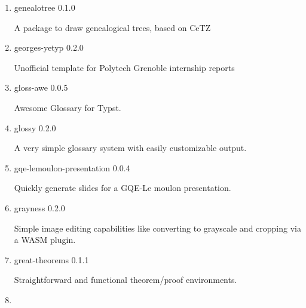 \begin{enumerate}

  { g-exam } { 0.4.1 }

  Create exams with student information, grade chart, score control,
  questions, and sub-questions.
\item
  \href{/universe/package/genealotree/}{}

  { genealotree } { 0.1.0 }

  A package to draw genealogical trees, based on CeTZ
\item
  \href{/universe/package/georges-yetyp/}{}


  { georges-yetyp } { 0.2.0 }

  Unofficial template for Polytech Grenoble internship reports
\item
  \href{/universe/package/gloss-awe/}{}

  { gloss-awe } { 0.0.5 }

  Awesome Glossary for Typst.
\item
  \href{/universe/package/glossy/}{}

  { glossy } { 0.2.0 }

  A very simple glossary system with easily customizable output.
\item
  \href{/universe/package/gqe-lemoulon-presentation/}{}


  { gqe-lemoulon-presentation } { 0.0.4 }

  Quickly generate slides for a GQE-Le moulon presentation.
\item
  \href{/universe/package/grayness/}{}

  { grayness } { 0.2.0 }

  Simple image editing capabilities like converting to grayscale and
  cropping via a WASM plugin.
\item
  \href{/universe/package/great-theorems/}{}

  { great-theorems } { 0.1.1 }

  Straightforward and functional theorem/proof environments.
\item
  \href{/universe/package/gridlock/}{}


\end{enumerate}
